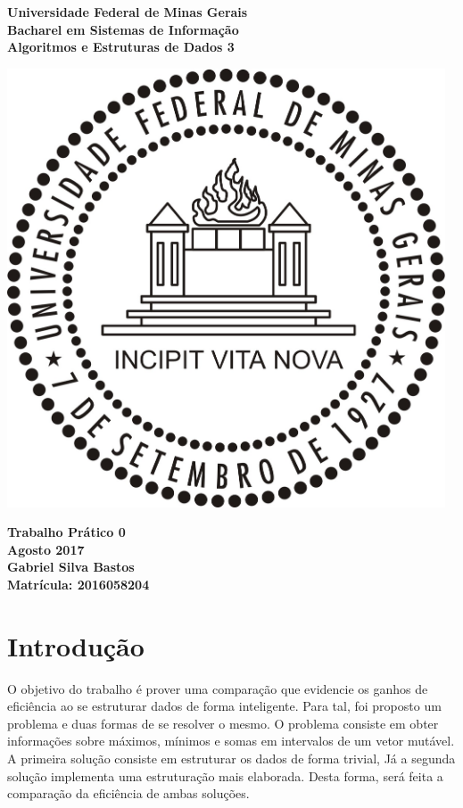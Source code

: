 \documentclass{article}
\begin{document}
\begin{titlepage}
  \centering
  
  \vfill{
    \bfseries\Huge
    Universidade Federal de Minas Gerais\\[5pt]
    \bfseries\Large
    Bacharel em Sistemas de Informação \\
    Algoritmos e Estruturas de Dados 3\\
  }
  
  \vfill
  
  \includegraphics[width=13cm]{images/ufmg_logo.jpg}
  
  \vfill{
    \bfseries\Large
    Trabalho Prático 0\\
    Agosto 2017\\
  }
  \vfill{
    \bfseries\large
    Gabriel Silva Bastos\\[5pt]
    Matrícula: 2016058204
  }
\end{titlepage}


\section{Introdução}
O objetivo do trabalho é prover uma comparação que evidencie os ganhos de eficiência ao se estruturar dados de forma inteligente. Para tal, foi proposto um problema e duas formas de se resolver o mesmo. O problema consiste em obter informações sobre máximos, mínimos e somas em intervalos de um vetor mutável. A primeira solução consiste em estruturar os dados de forma trivial, Já a segunda solução implementa uma estruturação mais elaborada. Desta forma, será feita a comparação da eficiência de ambas soluções.
\end{document}
